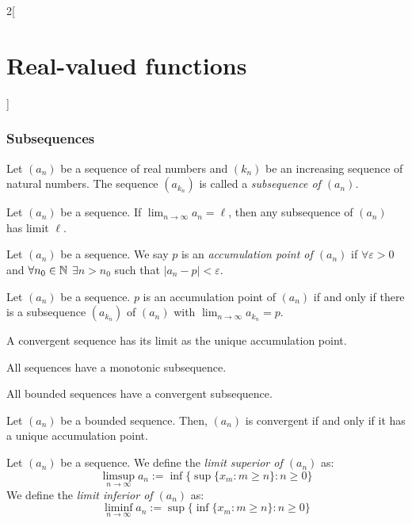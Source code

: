\documentclass[../../../main.tex]{subfiles}
\begin{document}
\begin{multicols}{2}[\section{Real-valued functions}]
    \subsubsection*{Subsequences}
    \begin{definition}[Subsequence]
        Let $(a_n)$ be a sequence of real numbers and $(k_n)$ be an increasing sequence of natural numbers. The sequence $(a_{k_n})$ is called a \textit{subsequence of $(a_n)$}.
    \end{definition}
    \begin{lemma}
        Let $(a_n)$ be a sequence. If $\displaystyle\lim_{n\to\infty} a_n=\ell$, then any subsequence of $(a_n)$ has limit $\ell$.
    \end{lemma}
    \begin{definition}
        Let $(a_n)$ be a sequence. We say $p$ is an \textit{accumulation point of $(a_n)$} if $\forall\varepsilon>0$ and $\forall n_0\in\mathbb{N}$ $\exists n>n_0$ such that $|a_n-p|<\varepsilon$.
    \end{definition}
    \begin{prop}
        Let $(a_n)$ be a sequence. $p$ is an accumulation point of $(a_n)$ if and only if there is a subsequence $(a_{k_n})$ of $(a_n)$ with $\displaystyle\lim_{n\to\infty}a_{k_n}=p$.
    \end{prop}
    \begin{corollary}
        A convergent sequence has its limit as the unique accumulation point.
    \end{corollary}
    \begin{prop}
        All sequences have a monotonic subsequence.
    \end{prop}
    \begin{theorem}
        All bounded sequences have a convergent subsequence.
    \end{theorem}
    \begin{prop}
        Let $(a_n)$ be a bounded sequence. Then, $(a_n)$ is convergent if and only if it has a unique accumulation point.
    \end{prop}
    \begin{definition}
        Let $(a_n)$ be a sequence. We define the \textit{limit superior of $(a_n)$} as:
        $$\limsup_{n\to\infty}a_n:=\inf\{\sup\{x_m:m\geq n\}:n\geq 0\}$$
        We define the \textit{limit inferior of $(a_n)$} as:
        $$\liminf_{n\to\infty}a_n:=\sup\{\inf\{x_m:m\geq n\}:n\geq 0\}$$
    \end{definition}
    \begin{prop}

\end{prop}
\end{multicols}
\end{document}

